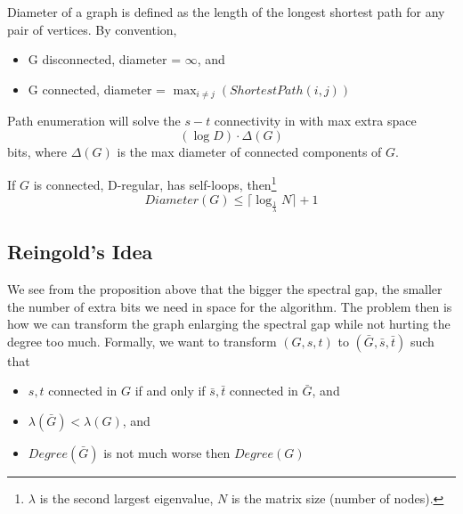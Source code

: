 \documentclass[11pt, letter]{book}
\begin{document}
\begin{definition}
	Diameter of a graph is defined as the length of the longest shortest path for any pair of vertices. By convention, 
	\begin{itemize}
		\item G disconnected, diameter = $\infty$, and
		\item G connected, diameter = $\max_{i \neq j} \left( ShortestPath (i, j) \right)$
	\end{itemize}
\end{definition}

\begin{proposition}
	Path enumeration will solve the $s-t$ connectivity in with max extra space 
	\begin{equation}
		(\log D) \cdot \Delta (G) \label{eq:path_enumeration_extra_space}
	\end{equation} 
	bits, where $\Delta (G)$ is the max diameter of connected components of $G$. 
\end{proposition}

\begin{proposition}
	If $G$ is connected, D-regular, has self-loops, then\footnote{$\lambda$ is the second largest eigenvalue, $N$ is the matrix size (number of nodes).}
	\begin{equation}
		Diameter(G) \leq \lceil \log _{\frac{1}{\lambda}} N \rceil + 1
	\end{equation}
\end{proposition}


\subsection{Reingold's Idea}\label{reingold_algo}
We see from the proposition above that the bigger the spectral gap, the smaller the number of extra bits we need in space for the algorithm. The problem then is how we can transform the graph enlarging the spectral gap while not hurting the degree too much. Formally, we want to transform $(G, s, t)$ to $(\bar G, \bar s, \bar t)$ such that 
\begin{itemize}
	\item $s, t$ connected in $G$ if and only if $\bar s, \bar t$ connected in $\bar G$, and
	\item $\lambda (\bar G) < \lambda (G)$, and
	\item $Degree(\bar G)$ is not much worse then $Degree(G)$
\end{itemize}
\end{document}
